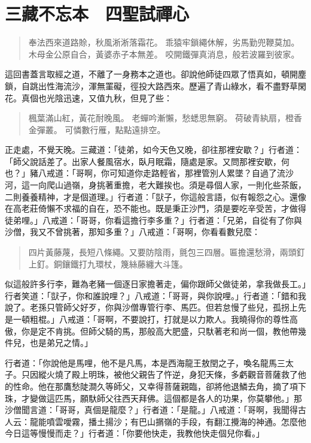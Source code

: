
\chapter{三藏不忘本　四聖試禪心}

\begin{quote}
奉法西來道路賒，秋風淅淅落霜花。
乖猿牢鎖繩休解，劣馬勤兜鞭莫加。
木母金公原自合，黃婆赤子本無差。
咬開鐵彈真消息，般若波羅到彼家。
\end{quote}

這回書蓋言取經之道，不離了一身務本之道也。卻說他師徒四眾了悟真如，頓開塵鎖，自跳出性海流沙，渾無罣礙，徑投大路西來。歷遍了青山綠水，看不盡野草閑花。真個也光陰迅速，又值九秋，但見了些：
\begin{quote}
楓葉滿山紅，黃花耐晚風。
老蟬吟漸懶，愁蟋思無窮。
荷破青紈扇，橙香金彈叢。
可憐數行雁，點點遠排空。
\end{quote}

正走處，不覺天晚。三藏道：「徒弟，如今天色又晚，卻往那裡安歇？」行者道：「師父說話差了。出家人餐風宿水，臥月眠霜，隨處是家。又問那裡安歇，何也？」豬八戒道：「哥啊，你可知道你走路輕省，那裡管別人累墜？自過了流沙河，這一向爬山過嶺，身挑著重擔，老大難挨也。須是尋個人家，一則化些茶飯，二則養養精神，才是個道理。」行者道：「獃子，你這般言語，似有報怨之心。還像在高老莊倚懶不求福的自在，恐不能也。既是秉正沙門，須是要吃辛受苦，才做得徒弟哩。」八戒道：「哥哥，你看這擔行李多重？」行者道：「兄弟，自從有了你與沙僧，我又不曾挑著，那知多重？」八戒道：「哥啊，你看看數兒麼：
\begin{quote}
四片黃藤蔑，長短八條繩。又要防陰雨，氈包三四層。匾擔還愁滑，兩頭釘上釘。銅鑲鐵打九環杖，篾絲藤纏大斗篷。
\end{quote}

似這般許多行李，難為老豬一個逐日家擔著走，偏你跟師父做徒弟，拿我做長工。」行者笑道：「獃子，你和誰說哩？」八戒道：「哥哥，與你說哩。」行者道：「錯和我說了。老孫只管師父好歹，你與沙僧專管行李、馬匹。但若怠慢了些兒，孤拐上先是一頓粗棍。」八戒道：「哥啊，不要說打，打就是以力欺人。我曉得你的尊性高傲，你是定不肯挑。但師父騎的馬，那般高大肥盛，只馱著老和尚一個，教他帶幾件兒，也是弟兄之情。」

行者道：「你說他是馬哩，他不是凡馬，本是西海龍王敖閏之子，喚名龍馬三太子。只因縱火燒了殿上明珠，被他父親告了忤逆，身犯天條，多虧觀音菩薩救了他的性命。他在那鷹愁陡澗久等師父，又幸得菩薩親臨，卻將他退鱗去角，摘了項下珠，才變做這匹馬，願馱師父往西天拜佛。這個都是各人的功果，你莫攀他。」那沙僧聞言道：「哥哥，真個是龍麼？」行者道：「是龍。」八戒道：「哥啊，我聞得古人云：龍能噴雲噯霧，播土揚沙；有巴山㨝嶺的手段，有翻江攪海的神通。怎麼他今日這等慢慢而走？」行者道：「你要他快走，我教他快走個兒你看。」

